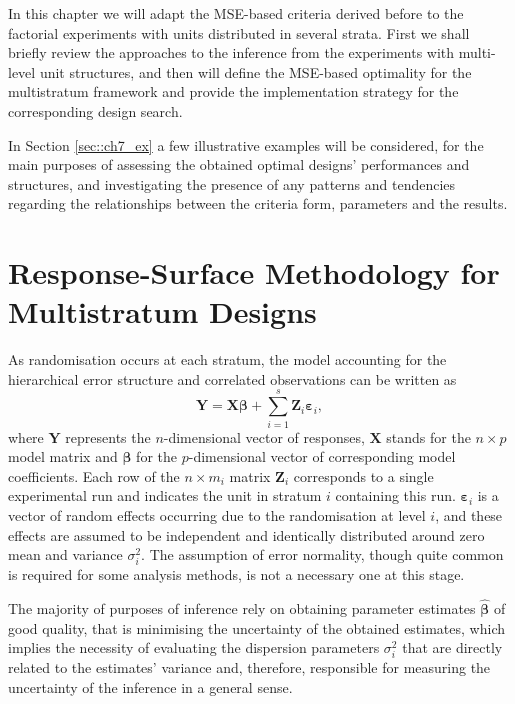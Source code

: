 In this chapter we will adapt the MSE-based criteria derived before to the factorial experiments with units distributed in several strata. First we shall briefly review the approaches to the inference from the experiments with multi-level unit structures, and then will define the MSE-based optimality for the multistratum framework and provide the implementation strategy for the corresponding design search.

In Section \ref{sec::ch7_ex} a few illustrative examples will be considered, for the main purposes of assessing the obtained optimal designs' performances and structures, and investigating the presence of any patterns and tendencies regarding the relationships between the criteria form, parameters and the results. 

\section{Response-Surface Methodology for Multistratum Designs}
As randomisation occurs at each stratum, the model accounting for the hierarchical error structure and correlated observations can be written as
\begin{equation}
\label{eq::MS_model}
\bm{Y}=\bm{X}\bm{\beta}+\sum_{i=1}^{s}\bm{Z}_{i}\bm{\varepsilon}_{i},
\end{equation}
where $\bm{Y}$ represents the $n$-dimensional vector of responses, $\bm{X}$ stands for the $n \times p$ model matrix and $\bm{\beta}$ for the $p$-dimensional vector of corresponding model coefficients. Each row of the $n\times m_{i}$ matrix $\bm{Z}_{i}$ corresponds to a single experimental run and indicates the unit in stratum $i$ containing this run. $\bm{\varepsilon}_{i}$ is a vector of random effects occurring due to the randomisation at level $i$, and these effects are assumed to be independent and identically distributed around zero mean and variance $\sigma^{2}_{i}$. The assumption of error normality, though quite common is required for some analysis methods, is not a necessary one at this stage.

The majority of purposes of inference rely on obtaining parameter estimates $\bm{\hat{\beta}}$ of good quality, that is minimising the uncertainty of the obtained estimates, which implies the necessity of evaluating the dispersion parameters $\sigma^2_{i}$ that are directly related to the estimates' variance and, therefore, responsible for measuring the uncertainty of the inference in a general sense.

